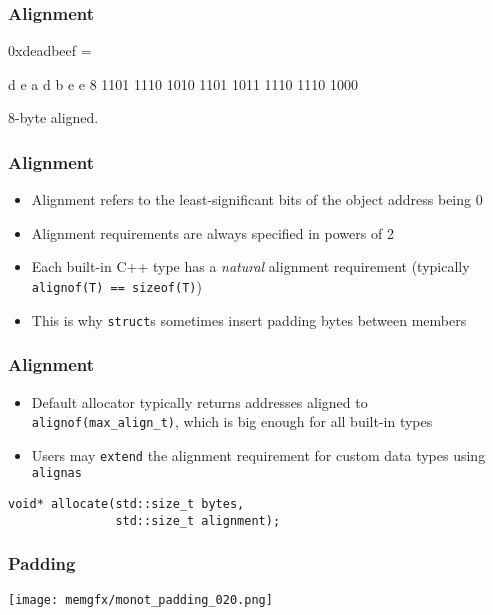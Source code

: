 \documentclass[aspectratio=169]{beamer}
\begin{document}
\begin{frame}[fragile]
  \frametitle{Alignment}
  \begin{semiverbatim}
    0xdeadbeef =

   d    e    a    d    b    e    e    {\color{red}8}
 1101 1110 1010 1101 1011 1110 1110 1{\color{red}000}
  \end{semiverbatim}

  8-byte aligned.
\end{frame}


\begin{frame}[fragile]
  \frametitle{Alignment}

  \begin{itemize}
  \item Alignment refers to the least-significant bits of the object address being 0
  \item Alignment requirements are always specified in powers of 2
  \item Each built-in C++ type has a \textit{natural} alignment requirement (typically \texttt{alignof(T) == sizeof(T)})
    \item This is why \texttt{struct}s sometimes insert padding bytes between members
  \end{itemize}
\end{frame}


\begin{frame}[fragile]
  \frametitle{Alignment}

  \begin{itemize}
  \item Default allocator typically returns addresses aligned to \texttt{alignof(max\_align\_t)}, which is big enough for all built-in types
  \item Users may \texttt{extend} the alignment requirement for custom data types using \texttt{alignas}
  \end{itemize}

  \begin{lstlisting}
void* allocate(std::size_t bytes,
               std::size_t alignment);
  \end{lstlisting}
\end{frame}

\begin{frame}[fragile]
  \frametitle{Padding}
  \begin{center}
    \texttt{[image: memgfx/monot\_padding\_020.png]}
  \end{center}
\end{frame}
\end{document}
